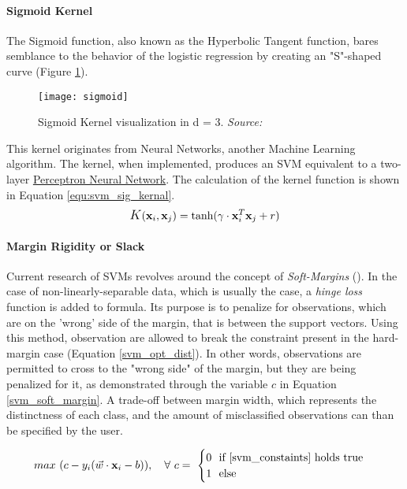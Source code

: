 	\paragraph{Sigmoid Kernel}
		The Sigmoid function, also known as the Hyperbolic Tangent function, bares semblance to the behavior of the logistic regression by creating an "S"-shaped curve (Figure \ref{fig:svm_sig_kernale}). 
		
		\begin{figure}[h]
			\centering
			\captionsetup{width=0.8\textwidth}
			\texttt{[image: sigmoid]}
			\caption[Sigmoid Kernel]{
				\footnotesize{
					Sigmoid Kernel visualization in d = 3. \textit{Source:} \cite{carrington2014new}
				}
			}
			\label{fig:svm_sig_kernale}
		\end{figure}
		
		This kernel originates from Neural Networks, another Machine Learning algorithm. The kernel, when implemented, produces an SVM equivalent to a two-layer \hyperref[ann]{Perceptron Neural Network}. The calculation of the kernel function is shown in Equation \ref{equ:svm_sig_kernal}.
		\begin{equation}
			\mathlarger{K}(\textbf{x}_i,\textbf{x}_j) = \text{tanh}(\gamma \cdot \textbf{x}^T_i \textbf{x}_j + r)
			\label{equ:svm_sig_kernal}
		\end{equation}
		
	
	
	\paragraph{Margin Rigidity or Slack}
		Current research of SVMs revolves around the concept of \textit{Soft-Margins} (\cite{SVM_cortes1995support}). In the case of non-linearly-separable data, which is usually the case, a \textit{hinge loss} function is added to formula. Its purpose is to penalize for observations, which are on the 'wrong' side of the margin, that is between the support vectors. Using this method, observation are allowed to break the constraint present in the hard-margin case (Equation \ref{svm_opt_dist}). In other words, observations are permitted to cross to the "wrong side" of the margin, but they are being penalized for it, as demonstrated through the variable $c$ in Equation \ref{svm_soft_margin}. A trade-off between margin width, which represents the distinctness of each class, and the amount of misclassified observations can than be specified by the user.
	
		\begin{equation}
			\begin{aligned}
				max \ (c - y_i(\vec{w} \cdot \textbf{x}_i - b)), 
				\  \ \ \forall \ c = \ 
				\begin{cases} 
					0 \ \ \text{if} \ \ref{svm_constaints}\ \text{holds true}\\
					1 \ \ \text{else}
				\end{cases}
			\end{aligned}
			\label{svm_soft_margin}
		\end{equation}
	
